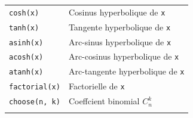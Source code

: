 \documentclass[
  11pt,
]{book}
\numberwithin{equation}{section}
\numberwithin{countremarque}{section}
\begin{document}
\begin{longtable}[]{@{}ll@{}}
\begin{minipage}[t]{0.41\columnwidth}
\texttt{cosh(x)}\strut
\end{minipage} & \begin{minipage}[t]{0.53\columnwidth}\raggedright
Cosinus hyperbolique de \texttt{x}\strut
\end{minipage}\tabularnewline
\begin{minipage}[t]{0.41\columnwidth}\raggedright
\texttt{tanh(x)}\strut
\end{minipage} & \begin{minipage}[t]{0.53\columnwidth}\raggedright
Tangente hyperbolique de \texttt{x}\strut
\end{minipage}\tabularnewline
\begin{minipage}[t]{0.41\columnwidth}\raggedright
\texttt{asinh(x)}\strut
\end{minipage} & \begin{minipage}[t]{0.53\columnwidth}\raggedright
Arc-sinus hyperbolique de \texttt{x}\strut
\end{minipage}\tabularnewline
\begin{minipage}[t]{0.41\columnwidth}\raggedright
\texttt{acosh(x)}\strut
\end{minipage} & \begin{minipage}[t]{0.53\columnwidth}\raggedright
Arc-cosinus hyperbolique de \texttt{x}\strut
\end{minipage}\tabularnewline
\begin{minipage}[t]{0.41\columnwidth}\raggedright
\texttt{atanh(x)}\strut
\end{minipage} & \begin{minipage}[t]{0.53\columnwidth}\raggedright
Arc-tangente hyperbolique de \texttt{x}\strut
\end{minipage}\tabularnewline
\begin{minipage}[t]{0.41\columnwidth}\raggedright
\texttt{factorial(x)}\strut
\end{minipage} & \begin{minipage}[t]{0.53\columnwidth}\raggedright
Factorielle de \texttt{x}\strut
\end{minipage}\tabularnewline
\begin{minipage}[t]{0.41\columnwidth}\raggedright
\texttt{choose(n,\ k)}\strut
\end{minipage} & \begin{minipage}[t]{0.53\columnwidth}\raggedright
Coeffcient binomial \(C_n^k\)\strut
\end{minipage}\tabularnewline
\begin{minipage}[t]{0.41\columnwidth}\raggedright

\end{minipage}
\end{longtable}
\end{document}
